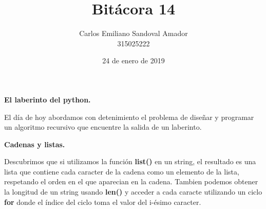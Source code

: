 \documentclass[letterpaper, 12pt, oneside]{article}%
\title{Bitácora 14}
\author{Carlos Emiliano Sandoval Amador \\ 315025222}
\date{24 de enero de 2019}
\begin{document}
	\maketitle
	\begin{center}
		\textbf{\large El laberinto del python.} 
	\end{center}
	El día de hoy abordamos con detenimiento el problema de diseñar y programar un algoritmo recursivo que encuentre la salida de un laberinto. \\
	\begin{center}
		\textbf{\large Cadenas y listas.} 
	\end{center}
	Descubrimos que si utilizamos la función \textbf{list()} en un string, el resultado es una lista que contiene cada caracter de la cadena como un elemento de la lista, respetando el orden en el que aparecian en la cadena. Tambien podemos obtener la longitud de un string usando \textbf{len()} y acceder a cada caracte utilizando un ciclo \textbf{for} donde el índice del ciclo toma el valor del i-ésimo caracter.
\end{document}
